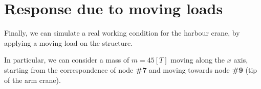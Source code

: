 \section{Response due to moving loads}
\label{sec:moving_loads_response}

Finally, we can simulate a real working condition for the harbour crane, by applying a moving load on the structure.

In particular, we can consider a mass of $m = 45[T]$ moving along the $x$ axis, starting from the correspondence of node \textbf{\#7} and moving towards node \textbf{\#9} (tip of the arm crane).





